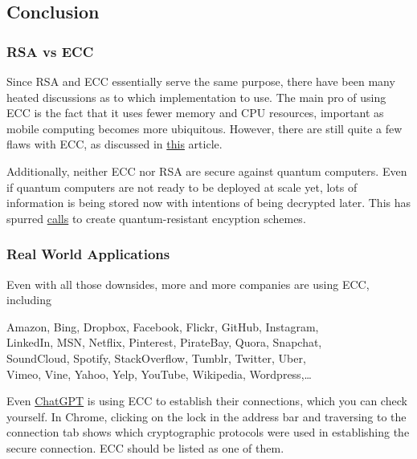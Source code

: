 \documentclass{article}
\begin{document}
\subsection*{Conclusion}

    \subsubsection*{RSA vs ECC}

    Since RSA and ECC essentially serve the same purpose, there have been many heated discussions as to which implementation to use. The main pro of using ECC is the fact that it uses fewer memory and CPU resources, important as mobile computing becomes more ubiquitous. However, there are still quite a few flaws with ECC, as discussed in \href{https://www.isaca.org/-/media/files/isacadp/project/isaca/articles/journal/2016/volume-3/can-elliptic-curve-cryptography-be-trusted_joa_eng_0516.pdf}{this} article.
    
    \vspace{2mm}
    Additionally, neither ECC nor RSA are secure against quantum computers. Even if quantum computers are not ready to be deployed at scale yet, lots of information is being stored now with intentions of being decrypted later. This has spurred \href{https://csrc.nist.gov/projects/post-quantum-cryptography}{calls} to create quantum-resistant encyption schemes.

    \subsubsection*{Real World Applications}

    Even with all those downsides, more and more companies are using ECC, including

    \begin{center}
        Amazon, Bing, Dropbox, Facebook, Flickr, GitHub, Instagram, \\
        LinkedIn, MSN, Netflix, Pinterest, PirateBay, Quora, Snapchat, \\
        SoundCloud, Spotify, StackOverflow, Tumblr, Twitter, Uber, \\
        Vimeo, Vine, Yahoo, Yelp, YouTube, Wikipedia, Wordpress,\dots
    \end{center}
    Even \href{https://chat.openai.com/chat}{ChatGPT} is using ECC to establish their connections, which you can check yourself. In Chrome, clicking on the lock in the address bar and traversing to the connection tab shows which cryptographic protocols were used in establishing the secure connection. ECC should be listed as one of them.
\end{document}
